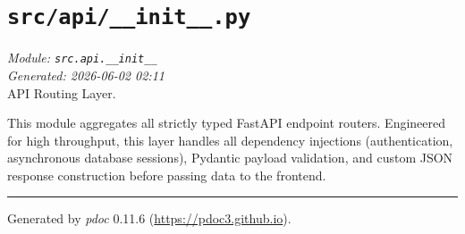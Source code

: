 
\section{\texttt{src/api/\_\_init\_\_.py}}
\textit{Module: \texttt{src.api.\_\_init\_\_}} \\
\textit{Generated: 2026-06-02 02:11} \\

API Routing Layer.

This module aggregates all strictly typed FastAPI endpoint routers.
Engineered for high throughput, this layer handles all dependency
injections (authentication, asynchronous database sessions), Pydantic
payload validation, and custom JSON response construction before passing
data to the frontend.

\begin{center}\rule{0.5\linewidth}{0.5pt}
\end{center}

Generated by \emph{pdoc} 0.11.6 (\url{https://pdoc3.github.io}).
